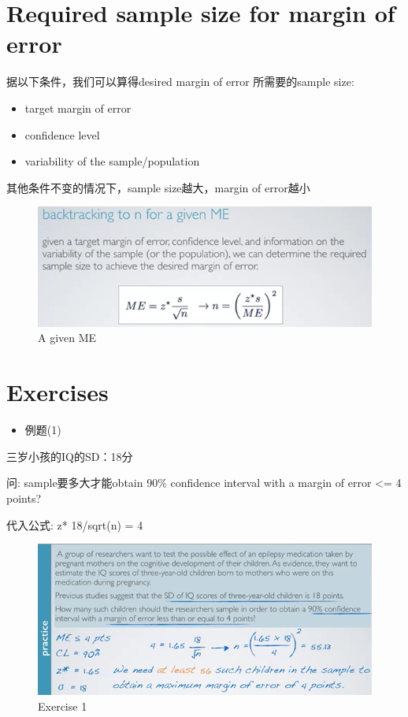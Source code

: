 \documentclass[]{book}
\providecommand{\tightlist}{%
  \setlength{\itemsep}{0pt}\setlength{\parskip}{0pt}}
\begin{document}
\section{Required sample size for margin of
error}\label{required-sample-size-for-margin-of-error}

据以下条件，我们可以算得desired margin of error 所需要的sample size:

\begin{itemize}
\tightlist
\item
  target margin of error
\item
  confidence level
\item
  variability of the sample/population
\end{itemize}

其他条件不变的情况下，sample size越大，margin of error越小

\begin{figure}

{\centering \includegraphics[width=0.8\linewidth]{graphs/2-12} 

}

\caption{A given ME}\label{fig:fig2-12}
\end{figure}

\section{Exercises}\label{exercises}

\begin{itemize}
\tightlist
\item
  例题(1)
\end{itemize}

三岁小孩的IQ的SD：18分

问: sample要多大才能obtain 90\% confidence interval with a margin of
error \textless{}= 4 points?

代入公式: z* 18/sqrt(n) = 4

\begin{figure}

{\centering \includegraphics[width=0.8\linewidth]{graphs/2-13} 

}

\caption{Exercise 1}\label{fig:fig2-13}
\end{figure}
\end{document}
